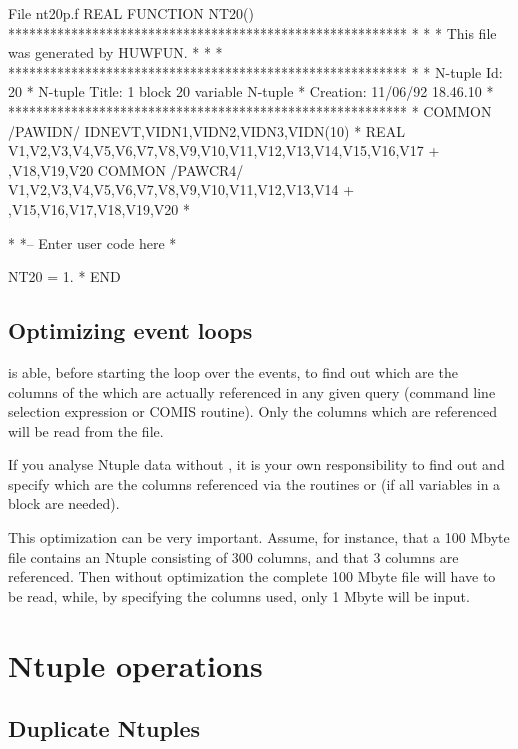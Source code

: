 \begin{XMPt}{File nt20p.f}
      REAL FUNCTION NT20()
*********************************************************
*                                                       *
* This file was generated by HUWFUN.                    *
*                                                       *
*********************************************************
*
*     N-tuple Id:     20
*     N-tuple Title:  1 block 20 variable N-tuple
*     Creation:       11/06/92 18.46.10
*
*********************************************************
*
      COMMON /PAWIDN/ IDNEVT,VIDN1,VIDN2,VIDN3,VIDN(10)
*
      REAL V1,V2,V3,V4,V5,V6,V7,V8,V9,V10,V11,V12,V13,V14,V15,V16,V17
     + ,V18,V19,V20
      COMMON /PAWCR4/ V1,V2,V3,V4,V5,V6,V7,V8,V9,V10,V11,V12,V13,V14
     + ,V15,V16,V17,V18,V19,V20
*

*
*--   Enter user code here
*

      NT20 = 1.
*
      END
\end{XMPt}

\subsection{Optimizing event loops}

\PAW{} is able, before starting the loop over the events, to find out
which are the columns of the \CWN{} which are actually referenced
in any given query (command line selection expression or COMIS routine).
Only the columns which are referenced will be read from the file.

If you  analyse Ntuple data without \PAW{}, it is your own
responsibility to find out and specify which are the columns
referenced via the routines  or  (if all variables
in a block are needed).

This optimization can be very important.
Assume, for instance, that a
100 Mbyte file contains an Ntuple consisting of
300 columns, and that 3 columns are referenced.
Then without optimization
the complete 100 Mbyte file will have to be read, while, by specifying
the columns used, only 1 Mbyte will be input.

\finalnewpage

\section{Ntuple operations}
\label{sec:Ntupleopeations}

\subsection*{Duplicate Ntuples}

